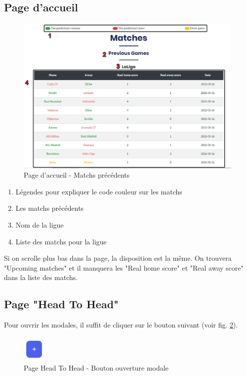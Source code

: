 \documentclass[a4paper,14pt]{extarticle}
\begin{document}
{\subsection{Page d'accueil}

\begin{figure}[H]
    \centering
    \includegraphics[width=30em]{./img/previousGamesHome.png}
    \caption{Page d'accueil - Matchs précédents}
    \label{fig:previousGamesHome}
\end{figure}

\begin{enumerate}
    \item Légendes pour expliquer le code couleur sur les matchs
    \item Les matchs précédents
    \item Nom de la ligue
    \item Liste des matchs pour la ligue
\end{enumerate}

Si on scrolle plus bas dans la page, la disposition est la même. On trouvera "Upcoming matches" et il manquera les "Real home score" et "Real away score" dans la liste des matchs.

\subsection{Page "Head To Head"}

Pour ouvrir les modales, il suffit de cliquer sur le bouton suivant (voir fig. \ref{fig:buttonOpenModal}). 

\begin{figure}[H]
    \centering
    \includegraphics[width=3em]{./img/buttonOpenModal.png}
    \caption{Page Head To Head - Bouton ouverture modale}
    \label{fig:buttonOpenModal}
\end{figure}

}
\end{document}
